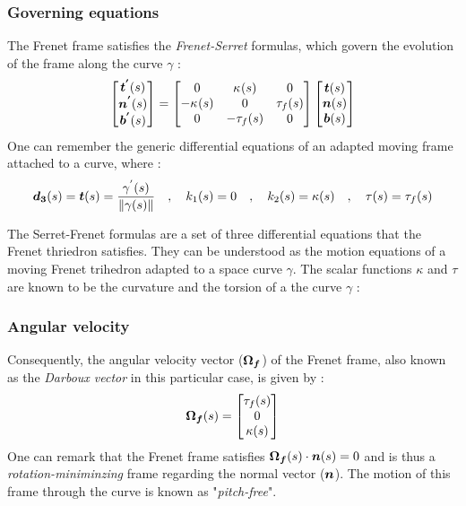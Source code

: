 \subsubsection{Governing equations}\label{sec:serretfrenet}
The Frenet frame satisfies the \emph{Frenet-Serret} formulas, which govern the evolution of the frame along the curve $\gamma$ :
\begin{equation}
	\begin{bmatrix}
		\boldsymbol{t^{'}}(s) \\
		\boldsymbol{n^{'}}(s) \\
		\boldsymbol{b^{'}}(s)
	\end{bmatrix}
	=
	\begin{bmatrix}
		0 & \kappa_{}(s) & 0 \\
		-\kappa_{}(s) & 0 & \tau_f(s) \\
		0 & -\tau_f(s) & 0
	\end{bmatrix}
	\begin{bmatrix}
		\boldsymbol{t}(s) \\
		\boldsymbol{n}(s) \\
		\boldsymbol{b}(s)
	\end{bmatrix}
\label{eq:3_12}
\end{equation}
One can remember the generic differential equations of an adapted moving frame attached to a curve, where :
\begin{gather}
\boldsymbol{d_{3}}(s) = \boldsymbol{t}(s) = \frac{\gamma^{'}(s)}{\|\gamma(s)\|}
\quad,\quad
k_{1}(s) = 0
\quad,\quad
k_{2}(s) = \kappa(s)
\quad,\quad
\tau(s) = \tau_{f}(s)
\end{gather}


The Serret-Frenet formulas are a set of three differential equations that the Frenet thriedron satisfies. They can be understood as the motion equations of a moving Frenet trihedron adapted to a space curve $\gamma$. The scalar functions $\kappa$ and $\tau$ are known to be the curvature and the torsion of a the curve $\gamma$ :

\subsubsection{Angular velocity}
Consequently, the angular velocity vector ($\boldsymbol{\Omega_{f}}$) of the Frenet frame, also known as the \emph{Darboux vector} in this particular case, is given by :
\begin{equation}
	\boldsymbol{\Omega_f}(s)
	=
	\begin{bmatrix}
		\tau_{f}(s) \\
		0 \\
		\kappa(s)
	\end{bmatrix}
\end{equation}
One can remark that the Frenet frame satisfies $\boldsymbol{\Omega_f}(s) \cdot \boldsymbol{n}(s) = 0$ and is thus a \emph{rotation-miniminzing} frame regarding the normal vector ($\boldsymbol{n}$). The motion of this frame through the curve is known as "\emph{pitch-free}".

